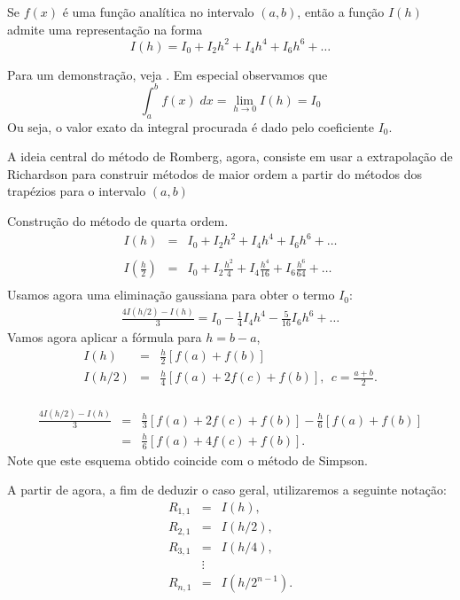 \begin{teo} Se $f(x)$ é uma função analítica no intervalo $(a,b)$, então a função $I(h)$ admite uma representação na forma
$$I(h)=I_0 + I_2 h^2 + I_4{h^4}+ I_6{h^6}+\ldots$$
\end{teo}
Para um demonstração, veja \cite{DEMAILLY}. Em especial observamos que
$$\int_a^b f(x)\;dx = \lim_{h\to 0}I(h)=I_0$$
Ou seja, o valor exato da integral procurada é dado pelo coeficiente $I_0$.

A ideia central do método de Romberg, agora, consiste em usar a extrapolação de Richardson para construir métodos de maior ordem a partir do métodos dos trapézios para o intervalo $(a,b)$
\begin{ex} \label{exemplo_romberg_1}Construção do método de quarta ordem.
\begin{eqnarray*}
I(h)&=&I_0 + I_2 h^2 + I_4{h^4}+ I_6{h^6}+\ldots\\~\\
I\left(\frac{h}{2}\right)&=&I_0 + I_2 \frac{h^2}{4} + I_4\frac{h^4}{16}+ I_6\frac{h^6}{64}+\ldots\\
\end{eqnarray*}
Usamos agora uma eliminação gaussiana para obter o termo $I_0$:
\begin{eqnarray*}
\frac{4I(h/2)-I(h)}{3}=I_0-\frac{1}{4}I_4h^4-\frac{5}{16}I_6h^6+\ldots
\end{eqnarray*}
Vamos agora aplicar a fórmula para $h=b-a$,
\begin{eqnarray*}
I(h)&=& \frac{h}{2} \left[f(a)+f(b)\right]\\
I(h/2)&=& \frac{h}{4} \left[f(a)+2f\left(c\right)+f(b)\right],~~ c=\frac{a+b}{2}.\\
\end{eqnarray*}

\begin{eqnarray*}
\frac{4I(h/2)-I(h)}{3}&=&\frac{h}{3}\left[f(a)+2f\left(c\right)+f(b)\right]-\frac{h}{6} \left[f(a)+f(b)\right]\\
&=&\frac{h}{6}\left[f(a)+4f\left(c\right)+f(b)\right].
\end{eqnarray*}
Note que este esquema obtido coincide com o método de Simpson.
\end{ex}

A partir de agora, a fim de deduzir o caso geral, utilizaremos a seguinte notação:
\begin{eqnarray*}
R_{1,1}&=&I(h),\\
R_{2,1}&=&I(h/2),\\
R_{3,1}&=&I(h/4),\\
&\vdots&\\
R_{n,1}&=&I(h/2^{n-1}).
\end{eqnarray*}

